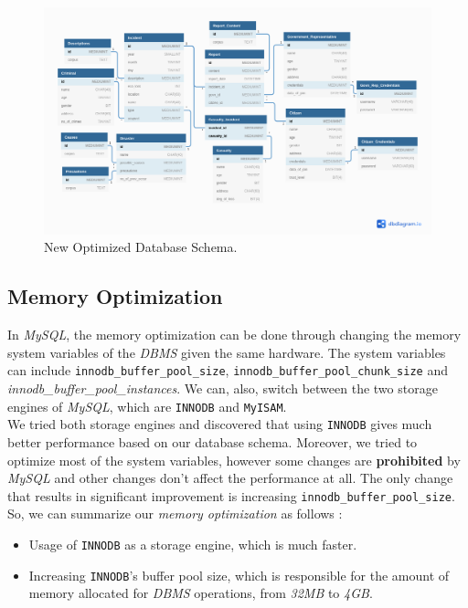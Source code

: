 \begin{figure}[H]
    \centering
    \includegraphics[width=\textwidth]{images/stats/optimized-schema.png}
    \caption{New Optimized Database Schema.}
    \label{fig:db-schema}
\end{figure}

\subsection{Memory Optimization}
In \emph{MySQL}, the memory optimization can be done through changing the memory system variables of the \emph{DBMS} given the same hardware. The system variables can include \texttt{innodb\_buffer\_pool\_size}, \texttt{innodb\_buffer\_pool\_chunk\_size} and \emph{innodb\_buffer\_pool\_instances}. We can, also, switch between the two storage engines of \emph{MySQL}, which are \texttt{INNODB} and \texttt{MyISAM}. \\

We tried both storage engines and discovered that using \texttt{INNODB} gives much better performance based on our database schema. Moreover, we tried to optimize most of the system variables, however some changes are \textbf{prohibited} by \emph{MySQL} and other changes don't affect the performance at all. The only change that results in significant improvement is increasing \texttt{innodb\_buffer\_pool\_size}. \\

So, we can summarize our \emph{memory optimization} as follows :
\begin{itemize}
    \item Usage of \texttt{INNODB} as a storage engine, which is much faster.
    \item Increasing \texttt{INNODB}'s buffer pool size, which is responsible for the amount of memory allocated for \emph{DBMS} operations, from \emph{32MB} to \emph{4GB}.
\end{itemize}

